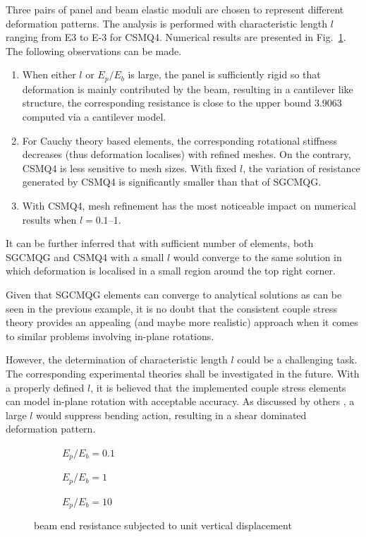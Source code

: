 \documentclass[3p,sort&compress,11pt,fleqn]{elsarticle}
\newcommand*{\figref}[1]{Fig.~\ref{#1}}
\begin{document}
Three pairs of panel and beam elastic moduli are chosen to represent different deformation patterns. The analysis is performed with characteristic length $l$ ranging from \num[print-unity-mantissa=false]{E3} to \num[print-unity-mantissa=false]{E-3} for CSMQ4. Numerical results are presented in \figref{fig:joint}. The following observations can be made.
\begin{enumerate}
\item When either $l$ or $E_p/E_b$ is large, the panel is sufficiently rigid so that deformation is mainly contributed by the beam, resulting in a cantilever like structure, the corresponding resistance is close to the upper bound \num{3.9063} computed via a cantilever model.
\item For Cauchy theory based elements, the corresponding rotational stiffness decreases (thus deformation localises) with refined meshes. On the contrary, CSMQ4 is less sensitive to mesh sizes. With fixed $l$, the variation of resistance generated by CSMQ4 is significantly smaller than that of SGCMQG.
\item With CSMQ4, mesh refinement has the most noticeable impact on numerical results when $l=\numrange{0.1}{1}$.
\end{enumerate}

It can be further inferred that with sufficient number of elements, both SGCMQG and CSMQ4 with a small $l$ would converge to the same solution in which deformation is localised in a small region around the top right corner.

Given that SGCMQG elements can converge to analytical solutions as can be seen in the previous example, it is no doubt that the consistent couple stress theory provides an appealing (and maybe more realistic) approach when it comes to similar problems involving in-plane rotations.

However, the determination of characteristic length $l$ could be a challenging task. The corresponding experimental theories shall be investigated in the future. With a properly defined $l$, it is believed that the implemented couple stress elements can model in-plane rotation with acceptable accuracy. As discussed by others \citep[e.g.,][]{Darrall2013}, a large $l$ would suppress bending action, resulting in a shear dominated deformation pattern.
\begin{figure}[H]
\centering\footnotesize
\begin{subfigure}[b]{.99\textwidth}\centering

\caption{$E_p/E_b=0.1$}
\end{subfigure}
\begin{subfigure}[b]{.99\textwidth}\centering

\caption{$E_p/E_b=1$}
\end{subfigure}
\begin{subfigure}[b]{.99\textwidth}\centering

\caption{$E_p/E_b=10$}
\end{subfigure}
\caption{beam end resistance subjected to unit vertical displacement}\label{fig:joint}
\end{figure}
\end{document}
